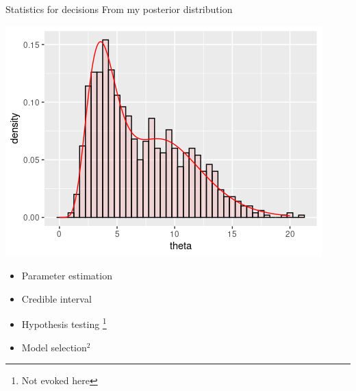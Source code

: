 \begin{frame}{Statistics for decisions}
 From my posterior distribution
 \begin{center}
 \includegraphics[width = 0.7 \textwidth]{figures/approx_post_MC.png}
 \end{center}
 
 \begin{multicols}{2}
    \begin{itemize}
      \item Parameter estimation
  \item Credible interval
  \item Hypothesis testing \footnote{\label{HOTS}Not evoked here}
  \item Model selection$^2$
    \end{itemize}
    \end{multicols}
   
 
\end{frame}



